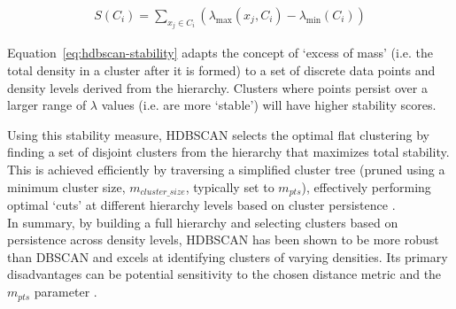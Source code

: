 \documentclass[10pt,oneside]{report}
\begin{document}
\begin{align}
S(C_i) = \sum_{x_j \in C_i} (\lambda_{\text{max}}(x_j, C_i) - \lambda_{\text{min}}(C_i))
\label{eq:hdbscan-stability}
\end{align}

Equation~\ref{eq:hdbscan-stability} adapts the concept of `excess of mass' (i.e. the total density in a cluster after it is formed) \cite{muller1991excess} to a set of discrete data points and density levels derived from the hierarchy.
Clusters where points persist over a larger range of $\lambda$ values (i.e. are more `stable') will have higher stability scores.

Using this stability measure, HDBSCAN selects the optimal flat clustering by finding a set of disjoint clusters from the hierarchy that maximizes total stability. This is achieved efficiently by traversing a simplified cluster tree (pruned using a minimum cluster size, $m_{cluster\_size}$, typically set to $m_{pts}$), effectively performing optimal `cuts' at different hierarchy levels based on cluster persistence \cite{campello2013density}. \\

\noindent In summary, by building a full hierarchy and selecting clusters based on persistence across density levels, HDBSCAN has been shown to be more robust than DBSCAN and excels at identifying clusters of varying densities. Its primary disadvantages can be potential sensitivity to the chosen distance metric and the $m_{pts}$ parameter \cite{campello2013density}.
\end{document}
